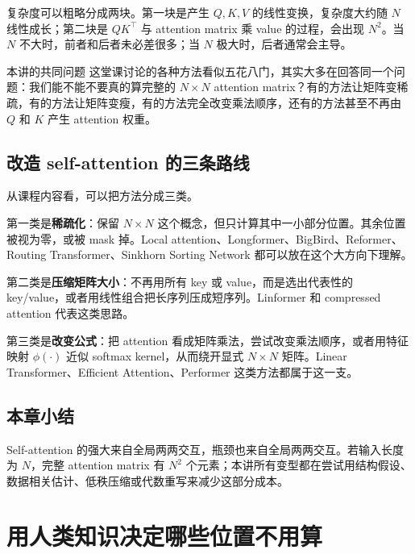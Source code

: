 \documentclass[a4paper]{article}
\begin{document}
复杂度可以粗略分成两块。第一块是产生 $Q,K,V$ 的线性变换，复杂度大约随 $N$ 线性成长；第二块是 $QK^\top$ 与 attention matrix 乘 value 的过程，会出现 $N^2$。当 $N$ 不大时，前者和后者未必差很多；当 $N$ 极大时，后者通常会主导。

\begin{knowledgebox}{本讲的共同问题}
    这堂课讨论的各种方法看似五花八门，其实大多在回答同一个问题：我们能不能不要真的算完整的 $N\times N$ attention matrix？有的方法让矩阵变稀疏，有的方法让矩阵变瘦，有的方法完全改变乘法顺序，还有的方法甚至不再由 $Q$ 和 $K$ 产生 attention 权重。
\end{knowledgebox}

\subsection{改造 self-attention 的三条路线}

从课程内容看，可以把方法分成三类。

第一类是\textbf{稀疏化}：保留 $N\times N$ 这个概念，但只计算其中一小部分位置。其余位置被视为零，或被 mask 掉。Local attention、Longformer、BigBird、Reformer、Routing Transformer、Sinkhorn Sorting Network 都可以放在这个大方向下理解。

第二类是\textbf{压缩矩阵大小}：不再用所有 key 或 value，而是选出代表性的 key/value，或者用线性组合把长序列压成短序列。Linformer 和 compressed attention 代表这类思路。

第三类是\textbf{改变公式}：把 attention 看成矩阵乘法，尝试改变乘法顺序，或者用特征映射 $\phi(\cdot)$ 近似 softmax kernel，从而绕开显式 $N\times N$ 矩阵。Linear Transformer、Efficient Attention、Performer 这类方法都属于这一支。

\subsection{本章小结}

Self-attention 的强大来自全局两两交互，瓶颈也来自全局两两交互。若输入长度为 $N$，完整 attention matrix 有 $N^2$ 个元素；本讲所有变型都在尝试用结构假设、数据相关估计、低秩压缩或代数重写来减少这部分成本。

\section{用人类知识决定哪些位置不用算}
\end{document}
